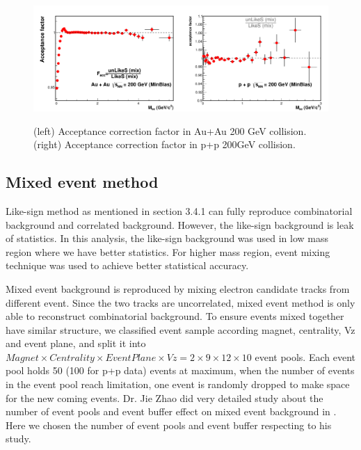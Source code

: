 \begin{figure}
\begin{centering}
\includegraphics[width=0.5\textwidth]{fig/3.Analysis/background/AuAu/paper_Acc}\includegraphics[width=0.5\textwidth]{fig/3.Analysis/background/pp/paper_Acc}
\par\end{centering}

\protect\caption{(left) Acceptance correction factor in Au+Au 200 GeV collision. (right)
Acceptance correction factor in p+p 200GeV collision.}


\label{fig:accfactor}
\end{figure}



\subsection{Mixed event method}

Like-sign method as mentioned in section 3.4.1 can fully reproduce
combinatorial background and correlated background. However, the like-sign
background is leak of statistics. In this analysis, the like-sign
background was used in low mass region where we have better statistics.
For higher mass region, event mixing technique was used to achieve
better statistical accuracy. 

Mixed event background is reproduced by mixing electron candidate
tracks from different event. Since the two tracks are uncorrelated,
mixed event method is only able to reconstruct combinatorial background.
To ensure events mixed together have similar structure, we classified
event sample according magnet, centrality, Vz and event plane, and
split it into $Magnet\times Centrality\times EventPlane\times Vz=2\times9\times12\times10$
event pools. Each event pool holds 50 (100 for p+p data) events at
maximum, when the number of events in the event pool reach limitation,
one event is randomly dropped to make space for the new coming events.
Dr. Jie Zhao did very detailed study about the number of event pools
and event buffer effect on mixed event background in \cite{Zhao:2013vn}.
Here we chosen the number of event pools and event buffer respecting
to his study.

